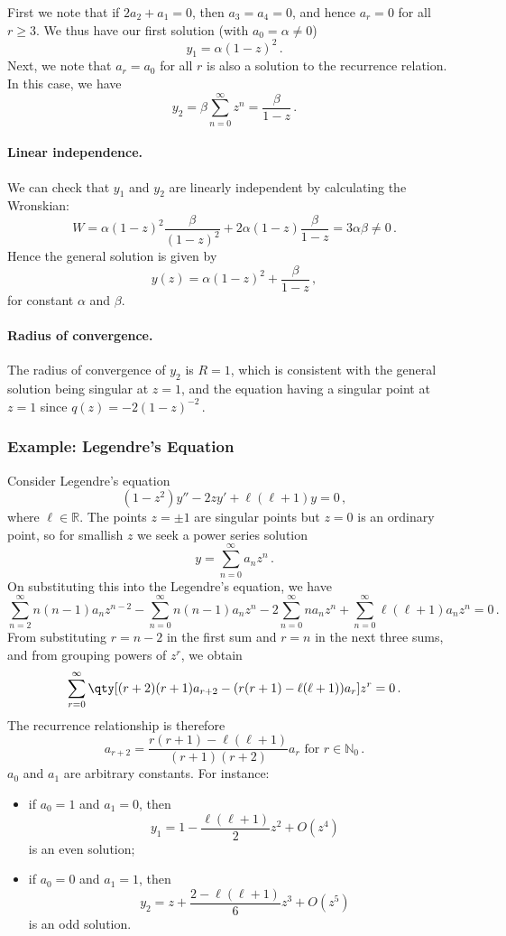 \documentclass{article}
\theoremstyle{plain}\theoremheaderfont{\normalfont\itshape}\theorembodyfont{\rmfamily}\theoremseparator{.}\newtheorem*{rem}{Remark}\newtheorem*{ex}{Example}\newtheorem*{proof}{Proof}\newtheorem*{altp}{Alternative proof}
\theoremstyle{plain}\theoremheaderfont{\normalfont\bfseries}\theorembodyfont{\rmfamily}\theoremseparator{.}\newtheorem{thm}{Theorem}[section]\newtheorem{lem}[thm]{Lemma}\newtheorem{prop}[thm]{Proposition}\newtheorem*{cor}{Corollary}\newtheorem{defn}[thm]{Definition}\newtheorem{clm}[thm]{Claim}\newtheorem{clminproof}{Claim}
\theoremstyle{break}\theoremheaderfont{\normalfont\itshape}\theorembodyfont{\rmfamily}\theoremseparator{.\medskip}\newtheorem*{proofskip}{Proof}\newtheorem*{exs}{Examples}\newtheorem*{rems}{Remarks}
\theoremstyle{break}\theoremheaderfont{\normalfont\bfseries}\theorembodyfont{\rmfamily}\theoremseparator{.\medskip}\newtheorem{lemskip}[thm]{Lemma}\newtheorem{defnskip}[thm]{Definition}\newtheorem{propskip}[thm]{Proposition}\newtheorem{thmskip}[thm]{Theorem}
\numberwithin{equation}{section}
\begin{document}
	First we note that if \(2a_2+a_1=0\), then \(a_3=a_4=0\), and hence \(a_r=0\) for all \(r\ge 3\). We thus have our first solution (with \(a_0=\alpha\ne0\))
	\[y_1=\alpha(1-z)^2\,.\]
	Next, we note that \(a_r=a_0\) for all \(r\) is also a solution to the recurrence relation. In this case, we have
	\[y_2=\beta\sum_{n=0}^{\infty}z^n=\frac{\beta}{1-z}\,.\]

	\paragraph{Linear independence.} We can check that \(y_1\) and \(y_2\) are linearly independent by calculating the Wronskian:
	\[W=\alpha(1-z)^2\frac{\beta}{(1-z)^2}+2\alpha(1-z)\frac{\beta}{1-z}=3\alpha\beta\ne 0\,.\]
	Hence the general solution is given by
	\[y(z)=\alpha(1-z)^2+\frac{\beta}{1-z}\,,\]
	for constant \(\alpha\) and \(\beta\).

	\paragraph{Radius of convergence.} The radius of convergence of \(y_2\) is \(R=1\), which is consistent with the general solution being singular at \(z=1\), and the equation having a singular point at \(z=1\) since \(q(z)=-2(1-z)^{-2}\,.\)

	\subsubsection{Example: Legendre's Equation}
	Consider Legendre's equation
	\begin{equation}\tag{\(*\)}
		(1-z^2)y''-2zy'+\ell(\ell+1)y=0\,,
	\end{equation}
	where \(\ell\in\mathbb{R}\). The points \(z=\pm 1\) are singular points but \(z=0\) is an ordinary point, so for smallish \(z\) we seek a power series solution
	\[y=\sum_{n=0}^{\infty}a_nz^n\,.\]
	On substituting this into the Legendre's equation, we have
	\[\sum_{n=2}^{\infty}n(n-1)a_nz^{n-2}-\sum_{n=0}^{\infty}n(n-1)a_nz^n-2\sum_{n=0}^{\infty}na_nz^n+\sum_{n=0}^{\infty}\ell(\ell+1)a_nz^n=0\,.\]
	From substituting \(r=n-2\) in the first sum and \(r=n\) in the next three sums, and from grouping powers of \(z^r\), we obtain
	\[\sum_{r=0}^{\infty}\qty[(r+2)(r+1)a_{r+2}-(r(r+1)-\ell(\ell+1))a_r]z^r=0\,.\]
	The recurrence relationship is therefore
	\[a_{r+2}=\frac{r(r+1)-\ell(\ell+1)}{(r+1)(r+2)}a_r\text{ for }r\in\mathbb{N}_0\,.\]
	\(a_0\) and \(a_1\) are arbitrary constants. For instance:
	\begin{itemize}[topsep=0pt]
		\item if \(a_0=1\) and \(a_1=0\), then
		\[y_1=1-\frac{\ell(\ell+1)}{2}z^2+O(z^4)\]
		is an even solution;
		\item if \(a_0=0\) and \(a_1=1\), then
		\[y_2=z+\frac{2-\ell(\ell+1)}{6}z^3+O(z^5)\]
		is an odd solution.
	\end{itemize}
	
\end{document}
